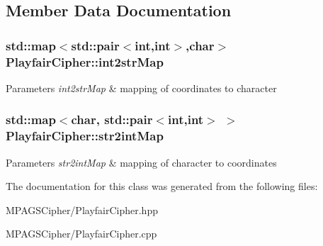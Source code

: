 \subsection{Member Data Documentation}
\hypertarget{class_playfair_cipher_ac02d4eb28101423fe0b9b5313c0b9cd5}{
\subsubsection[{int2str\-Map}]{\setlength{\rightskip}{0pt plus 5cm}std\-::map$<$std\-::pair$<$int,int$>$,char$>$ Playfair\-Cipher\-::int2str\-Map}}\label{class_playfair_cipher_ac02d4eb28101423fe0b9b5313c0b9cd5}

\begin{DoxyParams}{Parameters}
{\em int2str\-Map} & mapping of coordinates to character \\
\hline
\end{DoxyParams}
\hypertarget{class_playfair_cipher_a3171ced3a7a56d8fcf57e99d760db715}{
\subsubsection[{str2int\-Map}]{\setlength{\rightskip}{0pt plus 5cm}std\-::map$<$char, std\-::pair$<$int,int$>$ $>$ Playfair\-Cipher\-::str2int\-Map}}\label{class_playfair_cipher_a3171ced3a7a56d8fcf57e99d760db715}

\begin{DoxyParams}{Parameters}
{\em str2int\-Map} & mapping of character to coordinates \\
\hline
\end{DoxyParams}


The documentation for this class was generated from the following files\-:\begin{DoxyCompactItemize}
\item 
M\-P\-A\-G\-S\-Cipher/Playfair\-Cipher.\-hpp\item 
M\-P\-A\-G\-S\-Cipher/Playfair\-Cipher.\-cpp\end{DoxyCompactItemize}
